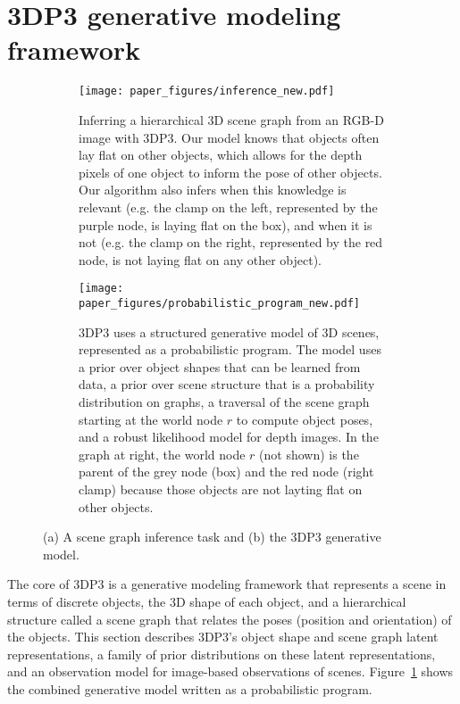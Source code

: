 \section{3DP3 generative modeling framework} \label{sec:model}

\begin{figure}[t]
    \begin{subfigure}[t]{\textwidth}
	\centering
	\texttt{[image: paper\_figures/inference\_new.pdf]}
\caption{%
Inferring a hierarchical 3D scene graph from an RGB-D image with 3DP3.
Our model knows that objects often lay flat on other objects, which allows for the depth pixels of one object to inform the pose of other objects.
Our algorithm also infers when this knowledge is relevant (e.g. the clamp on the left, represented by the purple node, is laying flat on the box), and when it is not (e.g. the clamp on the right, represented by the red node, is not laying flat on any other object).
}
    \end{subfigure}
    \begin{subfigure}[t]{\textwidth}
	\centering
\vspace{2mm}
	\texttt{[image: paper\_figures/probabilistic\_program\_new.pdf]}
\caption{%
3DP3 uses a structured generative model of 3D scenes, represented as a probabilistic program.
The model uses a prior over object shapes that can be learned from data,
a prior over scene structure that is a probability distribution on graphs,
a traversal of the scene graph starting at the world node $r$ to compute object poses,
and a robust likelihood model for depth images.
In the graph at right, the world node $r$ (not shown) is the parent of the grey node (box) and the red node (right clamp) because those objects are not layting flat on other objects.
}
    \end{subfigure}
\caption{%
(a) A scene graph inference task and (b) the 3DP3 generative model.
}
	\label{fig:model}
\end{figure}

The core of 3DP3 is a generative modeling framework that represents a scene in terms of discrete objects, the 3D shape of each object, and a hierarchical structure called a scene graph that relates the poses (position and orientation) of the objects.
This section describes 3DP3's object shape and scene graph latent representations,
a family of prior distributions on these latent representations, and 
an observation model for image-based observations of scenes.
Figure~\ref{fig:model} shows the combined generative model written as a probabilistic program.



